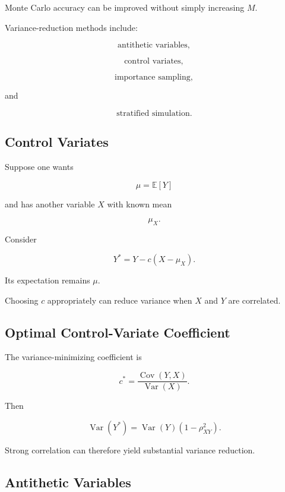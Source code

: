 Monte Carlo accuracy can be improved without simply increasing \(M\).

Variance-reduction methods include:

\[
\boxed{
\text{antithetic variables},
}
\]

\[
\boxed{
\text{control variates},
}
\]

\[
\boxed{
\text{importance sampling},
}
\]

and

\[
\boxed{
\text{stratified simulation}.
}
\]

\subsection{Control Variates}
\label{subsec:control-variates}

Suppose one wants

\[
\mu
=
\mathbb{E}[Y]
\]

and has another variable \(X\) with known mean

\[
\mu_X.
\]

Consider

\[
\boxed{
Y^*
=
Y
-
c
(
X-\mu_X
).
}
\]

Its expectation remains \(\mu\).

Choosing \(c\) appropriately can reduce variance when \(X\) and \(Y\) are
correlated.

\subsection{Optimal Control-Variate Coefficient}
\label{subsec:optimal-control-variate}

The variance-minimizing coefficient is

\[
\boxed{
c^*
=
\frac{
\operatorname{Cov}(Y,X)
}{
\operatorname{Var}(X)
}.
}
\]

Then

\[
\boxed{
\operatorname{Var}(Y^*)
=
\operatorname{Var}(Y)
(
1-\rho_{XY}^2
).
}
\]

Strong correlation can therefore yield substantial variance reduction.

\subsection{Antithetic Variables}
\label{subsec:antithetic-variables}

